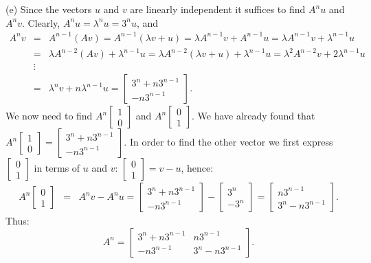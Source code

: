 \documentclass[11pt]{article}
\theoremstyle{definition}
\theoremstyle{plain}
\begin{document}
    (e) Since the vectors \( u \) and \( v \) are linearly independent it suffices to find \( A^nu \) and \( A^nv \). Clearly, \( A^nu=\lambda^nu=3^nu \), and \begin{eqnarray*} A^nv&=& A^{n-1}(Av)=A^{n-1}\left(\lambda v+u\right)=\lambda A^{n-1}v + A^{n-1}u=\lambda A^{n-1}v+\lambda^{n-1}u\\ &=& \lambda A^{n-2}\left(Av\right)+\lambda^{n-1}u=\lambda A^{n-2}\left(\lambda v+u\right)+\lambda^{n-1}u=\lambda^2 A^{n-2}v +2\lambda^{n-1}u\\ &\vdots&\\ &=&\lambda^nv+n\lambda^{n-1}u=\left[\begin{array}{c}3^n+n3^{n-1}\\ -n3^{n-1}\end{array}\right]. \end{eqnarray*} We now need to find \( A^n\left[\begin{array}{c} 1\\0\end{array}\right]\) and \( A^n\left[\begin{array}{c} 0\\1\end{array}\right]\). We have already found that \( A^n\left[\begin{array}{c} 1\\0\end{array}\right]=\left[\begin{array}{c}3^n+n3^{n-1}\\ -n3^{n-1}\end{array}\right]\). In order to find the other vector we first express \( \left[\begin{array}{c} 0\\1\end{array}\right]\) in terms of \( u \) and \( v \): \( \left[\begin{array}{c} 0\\1\end{array}\right]=v-u\), hence: \begin{eqnarray*} A^n\left[\begin{array}{c} 0\\1\end{array}\right]&=&A^nv-A^nu=\left[\begin{array}{c}3^n+n3^{n-1}\\ -n3^{n-1}\end{array}\right]- \left[\begin{array}{c}3^n\\ -3^n\end{array}\right]=\left[\begin{array}{c}n3^{n-1}\\ 3^n-n3^{n-1}\end{array}\right]. \end{eqnarray*} Thus: \[A^n=\left[\begin{array}{cc} 3^n+n3^{n-1} & n3^{n-1}\\ -n3^{n-1} & 3^n-n3^{n-1}\end{array}\right]. \]
\end{document}
